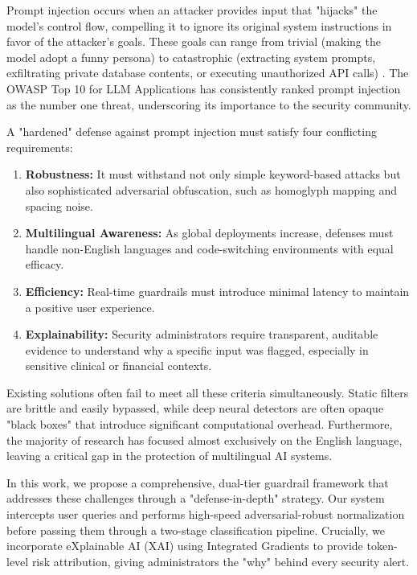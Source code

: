 \documentclass[10pt,conference]{IEEEtran}
\begin{document}
Prompt injection occurs when an attacker provides input that "hijacks" the model's control flow, compelling it to ignore its original system instructions in favor of the attacker's goals. These goals can range from trivial (making the model adopt a funny persona) to catastrophic (extracting system prompts, exfiltrating private database contents, or executing unauthorized API calls) \cite{owasp2025, rag_security}. The OWASP Top 10 for LLM Applications has consistently ranked prompt injection as the number one threat, underscoring its importance to the security community.

A "hardened" defense against prompt injection must satisfy four conflicting requirements:
\begin{enumerate}
    \item \textbf{Robustness:} It must withstand not only simple keyword-based attacks but also sophisticated adversarial obfuscation, such as homoglyph mapping and spacing noise.
    \item \textbf{Multilingual Awareness:} As global deployments increase, defenses must handle non-English languages and code-switching environments with equal efficacy.
    \item \textbf{Efficiency:} Real-time guardrails must introduce minimal latency to maintain a positive user experience.
    \item \textbf{Explainability:} Security administrators require transparent, auditable evidence to understand why a specific input was flagged, especially in sensitive clinical or financial contexts.
\end{enumerate}

Existing solutions often fail to meet all these criteria simultaneously. Static filters are brittle and easily bypassed, while deep neural detectors are often opaque "black boxes" that introduce significant computational overhead. Furthermore, the majority of research has focused almost exclusively on the English language, leaving a critical gap in the protection of multilingual AI systems.

In this work, we propose a comprehensive, dual-tier guardrail framework that addresses these challenges through a "defense-in-depth" strategy. Our system intercepts user queries and performs high-speed adversarial-robust normalization before passing them through a two-stage classification pipeline. Crucially, we incorporate eXplainable AI (XAI) using Integrated Gradients to provide token-level risk attribution, giving administrators the "why" behind every security alert.
\end{document}
